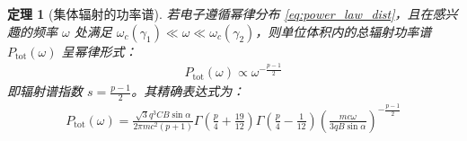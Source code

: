 \documentclass[12pt,oneside]{ctexart}
\theoremstyle{definition}
\theoremstyle{plain}
\newtheorem{theorem}[definition]{定理}
\theoremstyle{remark}
\begin{document}
\begin{theorem}[集体辐射的功率谱]
    若电子遵循幂律分布 \eqref{eq:power_law_dist}，且在感兴趣的频率 $\omega$ 处满足 $\omega_c(\gamma_1) \ll \omega \ll \omega_c(\gamma_2)$，则单位体积内的总辐射功率谱 $P_{\text{tot}}(\omega)$ 呈幂律形式：
    \begin{align}
        P_{\text{tot}}(\omega) \propto \omega^{-\frac{p-1}{2}}
    \end{align}
    即辐射谱指数 $s = \frac{p-1}{2}$。其精确表达式为：
    \begin{align}
        P_{\text{tot}}(\omega) = \frac{\sqrt{3} q^3 C B \sin\alpha}{2\pi m c^2 (p+1)} \Gamma\left(\frac{p}{4} + \frac{19}{12}\right) \Gamma\left(\frac{p}{4} - \frac{1}{12}\right) \left( \frac{m c \omega}{3 q B \sin\alpha} \right)^{-\frac{p-1}{2}}
    \end{align}
\end{theorem}
\end{document}

